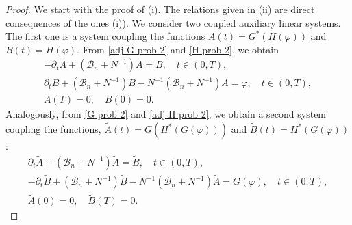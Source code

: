 \documentclass[10pt,a4paper]{amsart}
\numberwithin{equation}{section}
\begin{document}
\begin{proof}
We start with the proof of (i). The relations given in (ii)
are direct consequences of the ones (i)). 
We consider two coupled
auxiliary linear systems. The first one is a system coupling the functions 
$A(t)=G^{\ast }(H(\varphi ))$ and $B(t)=H(\varphi )$. From
\eqref{adj G prob 2} and \eqref{H prob 2}, we obtain
\begin{equation}
\begin{gathered}
-\partial _{t}A+(\mathcal{B}_n+N^{-1})A=B, \quad t\in (0,T), \\
\partial _{t}B+(\mathcal{B}_n+N^{-1})B-N^{-1}(\mathcal{B}
_n+N^{-1})A=\varphi , \quad t\in (0,T), \\
A(T)=0,\quad B(0)=0. 
\end{gathered}   \label{lem:func sys 1}
\end{equation}
Analogously, from \eqref{G prob 2} and \eqref{adj H prob 2}, we obtain a second
system coupling the functions, $\tilde{A}(t)=G(H^{\ast }(G(\varphi )))$ and 
$\tilde{B}(t)=H^{\ast }(G(\varphi ))$:
\begin{equation}
\begin{gathered}
\partial _{t}\tilde{A}+(\mathcal{B}_n+N^{-1})\tilde{A}=\tilde{B}, \quad t\in
(0,T), \\
-\partial _{t}\tilde{B}+(\mathcal{B}_n+N^{-1})\tilde{B}-N^{-1}(\mathcal{B}%
_n+N^{-1})\tilde{A}=G(\varphi ), \quad t\in (0,T), \\
\tilde{A}(0)=0,\quad \tilde{B}(T)=0. 
\end{gathered}   \label{lem:func sys 2}
\end{equation}


\end{proof}
\end{document}
